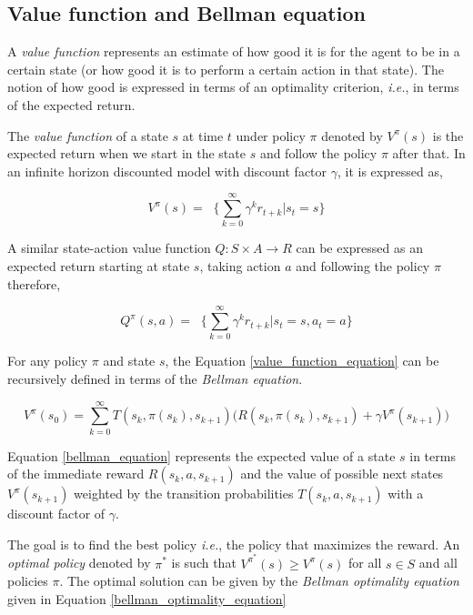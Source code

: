 \documentclass[12pt]{report}
\newcommand{\ie}{\textit{i.e.}}
\begin{document}
\subsection{Value function and Bellman equation}
A \textit{value function} represents an estimate of how good it is for the agent to be in a certain state (or how good it is to perform a certain action in that state). The notion of how good is expressed in
terms of an optimality criterion, \ie, in terms of the expected return.\par 
The \textit{value function} of a state $s$ at time $t$ under policy $\pi$ denoted by $V^\pi(s)$ is the expected return when we start in the state $s$ and follow the policy $\pi$ after that. In an infinite horizon discounted model with discount factor $\gamma$, it is expressed as, 

\begin{equation}
\label{value_function_equation}
V^\pi(s) =  \mathop{\mathbb{E_\pi}}\bigg\{\sum_{k=0}^{\infty} \gamma^k r_{t+k}|s_t = s\bigg\} 
\end{equation}

A similar state-action value function $Q : S \times A \rightarrow R$ can be expressed as an expected return starting at state $s$, taking action $a$ and following the policy $\pi$ therefore,

\begin{equation}
\label{value_function_state_action_equation}
Q^\pi(s,a) =  \mathop{\mathbb{E_\pi}}\bigg\{\sum_{k=0}^{\infty} \gamma^k r_{t+k}|s_t = s, a_t = a \bigg\} 
\end{equation}

For any policy $\pi$ and state $s$, the Equation \ref{value_function_equation} can be recursively defined in terms of the \textit{Bellman equation}\cite{Bellman:1957}. 

\begin{equation}
\label{bellman_equation}
V^\pi(s_0) = \sum_{k=0}^{\infty} T(s_k,\pi(s_k),s_{k+1}) \bigg( R(s_k,\pi(s_k),s_{k+1}) + \gamma V^\pi(s_{k+1})\bigg)
\end{equation}

Equation \ref{bellman_equation} represents the expected value of a state $s$ in terms of the immediate reward $R(s_k,a,s_{k+1})$ and the value of possible next states $V^\pi(s_{k+1})$ weighted by the transition probabilities $T(s_k,a,s_{k+1})$ with a discount factor of $\gamma$. \par

The goal is to find the best policy \ie, the policy that maximizes the reward. An \textit{optimal policy} denoted by $\pi^*$ is such that $V^{\pi^*}(s) \geq V^\pi(s)$
for all $s \in S$ and all policies $\pi$. The optimal solution can be given by the \textit{Bellman optimality equation} given in Equation \ref{bellman_optimality_equation}
\end{document}
